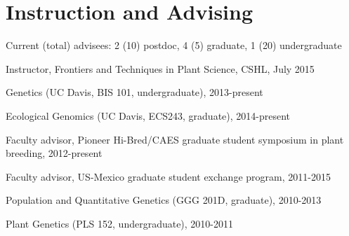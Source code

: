 \documentclass[letterpaper]{article}
\renewenvironment{itemize}{
  \begin{list}{}{
    \setlength{\leftmargin}{1.5em}
  }
}{
  \end{list}
}
\begin{document}
\section*{Instruction and Advising}
\begin{itemize}
\item Current (total) advisees: 2 (10) postdoc, 4 (5) graduate, 1 (20) undergraduate

\item Instructor, Frontiers and Techniques in Plant Science, CSHL, July 2015
\item Genetics (UC Davis, BIS 101, undergraduate), 2013-present
\item Ecological Genomics (UC Davis, ECS243, graduate), 2014-present
\item Faculty advisor, Pioneer Hi-Bred/CAES graduate student symposium in plant breeding, 2012-present
\item Faculty advisor, US-Mexico graduate student exchange program, 2011-2015
\item Population and Quantitative Genetics (GGG 201D, graduate), 2010-2013 %
\item Plant Genetics (PLS 152, undergraduate), 2010-2011 %

\end{itemize}
\end{document}
